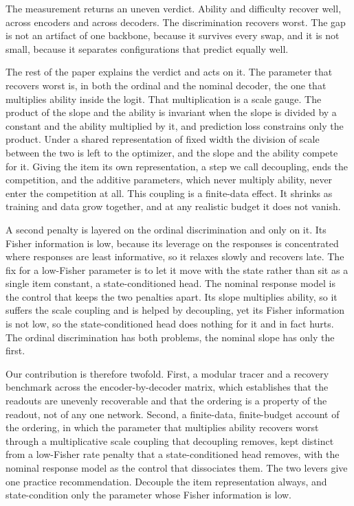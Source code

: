 \documentclass[sigconf,nonacm,screen]{acmart}
\begin{document}
The measurement returns an uneven verdict. Ability and difficulty recover well,
across encoders and across decoders. The discrimination recovers worst. The gap is
not an artifact of one backbone, because it survives every swap, and it is not
small, because it separates configurations that predict equally well.

The rest of the paper explains the verdict and acts on it. The parameter that
recovers worst is, in both the ordinal and the nominal decoder, the one that
multiplies ability inside the logit. That multiplication is a scale gauge. The
product of the slope and the ability is invariant when the slope is divided by a
constant and the ability multiplied by it, and prediction loss constrains only the
product. Under a shared representation of fixed width the division of scale between
the two is left to the optimizer, and the slope and the ability compete for it.
Giving the item its own representation, a step we call decoupling, ends the
competition, and the additive parameters, which never multiply ability, never
enter the competition at all. This coupling is a finite-data effect. It shrinks as
training and data grow together, and at any realistic budget it does not vanish.

A second penalty is layered on the ordinal discrimination and only on it. Its
Fisher information is low, because its leverage on the responses is concentrated
where responses are least informative, so it relaxes slowly and recovers late. The
fix for a low-Fisher parameter is to let it move with the state rather than sit as
a single item constant, a state-conditioned head. The nominal response model is the
control that keeps the two penalties apart. Its slope multiplies ability, so it
suffers the scale coupling and is helped by decoupling, yet its Fisher information
is not low, so the state-conditioned head does nothing for it and in fact hurts.
The ordinal discrimination has both problems, the nominal slope has only the first.

Our contribution is therefore twofold. First, a modular tracer and a recovery
benchmark across the encoder-by-decoder matrix, which establishes that the readouts
are unevenly recoverable and that the ordering is a property of the readout, not of
any one network. Second, a finite-data, finite-budget account of the ordering, in
which the parameter that multiplies ability recovers worst through a multiplicative
scale coupling that decoupling removes, kept distinct from a low-Fisher rate penalty
that a state-conditioned head removes, with the nominal response model as the
control that dissociates them. The two levers give one practice recommendation.
Decouple the item representation always, and state-condition only the parameter
whose Fisher information is low.
\end{document}
